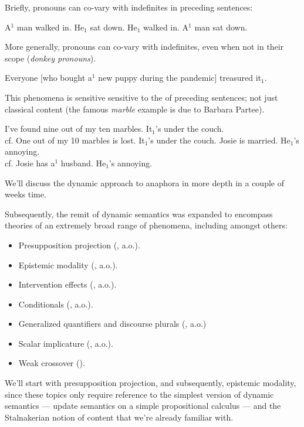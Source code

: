 \documentclass[nols,twoside,nofonts,nobib,nohyper]{tufte-handout}
\theoremstyle{definition}
\begin{document}
Briefly, pronouns can co-vary with indefinites in preceding sentences:

\pex
\a A$^{1}$ man walked in. He$_{1}$ sat down.
\a\ljudge{\#}He$_{1}$ walked in. A$^{1}$ man sat down.
\xe

More generally, pronouns can co-vary with indefinites, even when not in their scope (\textit{donkey pronouns}).

\ex Everyone [who bought a$^{1}$ new puppy during the pandemic] treasured it$_{1}$.
\xe

This phenomena is sensitive sensitive to the  of preceding sentences; not just classical content (the famous \textit{marble} example is due to Barbara Partee).

\pex
\a\ljudge{\#}I've found nine out of my ten marbles. It$_{1}$'s under the couch.\\
cf. One out of my 10 marbles is lost. It$_{1}$'s under the couch.
\a\ljudge{*}Josie is married. He$_{1}$'s annoying.\\
cf. Josie has a$^{1}$ husband. He$_{1}$'s annoying.
\xe

We'll discuss the dynamic approach to anaphora in more depth in a couple of weeks time.

Subsequently, the remit of dynamic semantics was expanded to encompass theories of an extremely broad range of phenomena, including amongst others:

\begin{itemize}

  \item Presupposition projection (\citealt{Heim1983,Beaver2001}, a.o.).
  \item Epistemic modality (\citealt{Veltman1996,GroenendijkEtAl1996}, a.o.).
  \item Intervention effects (\citealt{Honcoop1998}, a.o.).
  \item Conditionals (\citealt{Gillies2004}, a.o.).
  \item Generalized quantifiers and discourse plurals (\citealt{vandenBerg1996}, a.o.)
  \item Scalar implicature (\citealt{Sudo2019}, a.o.).
  \item Weak crossover (\citealt{Chierchia2020,Elliott2020b}).

\end{itemize}

We'll start with presupposition projection, and subsequently, epistemic modality, since these topics only require reference to the simplest version of dynamic semantics --- update semantics on a simple propositional calculus --- and the Stalnakerian notion of content that we're already familiar with.
\end{document}
